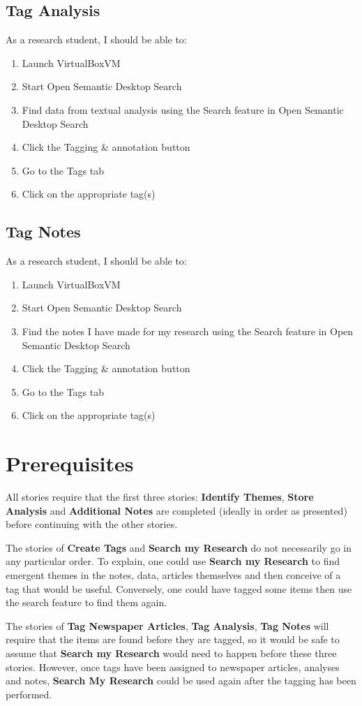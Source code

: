\documentclass{article}
\begin{document}
\subsection*{Tag Analysis}

As a research student, I should be able to:
\begin{enumerate}
    \item Launch VirtualBoxVM
    \item Start Open Semantic Desktop Search
    \item Find data from textual analysis using the Search feature in Open Semantic Desktop Search
    \item Click the Tagging \& annotation button
    \item Go to the Tags tab
    \item Click on the appropriate tag(s)
\end{enumerate}

\subsection*{Tag Notes}

As a research student, I should be able to:
\begin{enumerate}
    \item Launch VirtualBoxVM
    \item Start Open Semantic Desktop Search
    \item Find the notes I have made for my research using the Search feature in Open Semantic Desktop Search
    \item Click the Tagging \& annotation button
    \item Go to the Tags tab
    \item Click on the appropriate tag(s)
\end{enumerate}

\section*{Prerequisites}

All stories require that the first three stories: \textbf{Identify Themes}, \textbf{Store Analysis} and \textbf{Additional Notes} are completed (ideally in order as presented) before continuing with the other stories.

The stories of \textbf{Create Tags} and \textbf{Search my Research} do not necessarily go in any particular order. To explain, one could use \textbf{Search my Research} to find emergent themes in the notes, data, articles themselves and then conceive of a tag that would be useful. Conversely, one could have tagged some items then use the search feature to find them again. 

The stories of \textbf{Tag Newspaper Articles}, \textbf{Tag Analysis}, \textbf{Tag Notes} will require that the items are found before they are tagged, so it would be safe to assume that \textbf{Search my Research} would need to happen before these three stories. However, once tags have been assigned to newspaper articles, analyses and notes, \textbf{Search My Research} could be used again after the tagging has been performed.
\end{document}
